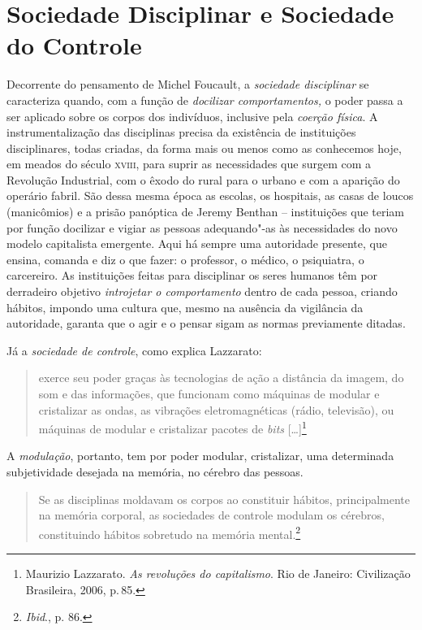 \section{Sociedade Disciplinar e Sociedade do Controle}

Decorrente do pensamento de Michel Foucault, a \emph{sociedade
disciplinar} se caracteriza quando, com a função de \emph{docilizar
comportamentos,} o poder passa a ser aplicado sobre os corpos dos
indivíduos, inclusive pela \emph{coerção física}. A instrumentalização
das disciplinas precisa da existência de instituições disciplinares,
todas criadas, da forma mais ou menos como as conhecemos hoje, em meados
do século \textsc{xviii}, para suprir as necessidades que surgem com a Revolução
Industrial, com o êxodo do rural para o urbano e com a aparição do
operário fabril. São dessa mesma época as escolas, os hospitais, as
casas de loucos (manicômios) e a prisão panóptica de Jeremy Benthan --
instituições que teriam por função docilizar e vigiar as pessoas
adequando"-as às necessidades do novo modelo capitalista emergente. Aqui
há sempre uma autoridade presente, que ensina, comanda e diz o que
fazer: o professor, o médico, o psiquiatra, o carcereiro. As
instituições feitas para disciplinar os seres humanos têm por derradeiro
objetivo \emph{introjetar o comportamento} dentro de cada pessoa,
criando hábitos, impondo uma cultura que, mesmo na ausência da
vigilância da autoridade, garanta que o agir e o pensar sigam as normas
previamente ditadas.

Já a \emph{sociedade de controle}, como explica Lazzarato:

\begin{quote}
exerce seu poder graças às tecnologias de ação a distância da imagem, do
som e das informações, que funcionam como máquinas de modular e
cristalizar as ondas, as vibrações eletromagnéticas (rádio, televisão),
ou máquinas de modular e cristalizar pacotes de \emph{bits} {[}\ldots{}{]}\footnote{Maurizio Lazzarato. \emph{As revoluções do capitalismo}. Rio de Janeiro: Civilização
Brasileira, 2006, p.\,85.}
\end{quote}

A \emph{modulação}, portanto, tem por poder modular, cristalizar, uma
determinada subjetividade desejada na memória, no cérebro das pessoas.

\begin{quote}
Se as disciplinas moldavam os corpos ao constituir hábitos,
principalmente na memória corporal, as sociedades de controle modulam os
cérebros, constituindo hábitos sobretudo na memória mental.\footnote{\textit{Ibid}., p. 86.}
\end{quote}


